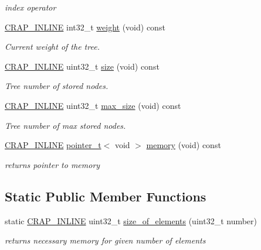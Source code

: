 \begin{DoxyCompactItemize}
\begin{DoxyCompactList}\small\item\em index operator \end{DoxyCompactList}\item 
\hyperlink{config__x86_8h_a5a40526b8d842e7ff731509998bb0f1c}{C\+R\+A\+P\+\_\+\+I\+N\+L\+I\+N\+E} int32\+\_\+t \hyperlink{classcrap_1_1tree_a19ad6ba585b2c718ac1384c4fb6a054f}{weight} (void) const 
\begin{DoxyCompactList}\small\item\em Current weight of the tree. \end{DoxyCompactList}\item 
\hyperlink{config__x86_8h_a5a40526b8d842e7ff731509998bb0f1c}{C\+R\+A\+P\+\_\+\+I\+N\+L\+I\+N\+E} uint32\+\_\+t \hyperlink{classcrap_1_1tree_aeb959132fdf029c341d17b4caf21ba43}{size} (void) const 
\begin{DoxyCompactList}\small\item\em Tree number of stored nodes. \end{DoxyCompactList}\item 
\hyperlink{config__x86_8h_a5a40526b8d842e7ff731509998bb0f1c}{C\+R\+A\+P\+\_\+\+I\+N\+L\+I\+N\+E} uint32\+\_\+t \hyperlink{classcrap_1_1tree_a325ba8dd1d5a510ce50116817583b605}{max\+\_\+size} (void) const 
\begin{DoxyCompactList}\small\item\em Tree number of max stored nodes. \end{DoxyCompactList}\item 
\hyperlink{config__x86_8h_a5a40526b8d842e7ff731509998bb0f1c}{C\+R\+A\+P\+\_\+\+I\+N\+L\+I\+N\+E} \hyperlink{structcrap_1_1pointer__t}{pointer\+\_\+t}$<$ void $>$ \hyperlink{classcrap_1_1tree_a64f079b15a1560ee59595e23a550d1d3}{memory} (void) const 
\begin{DoxyCompactList}\small\item\em returns pointer to memory \end{DoxyCompactList}\end{DoxyCompactItemize}
\subsection*{Static Public Member Functions}
\begin{DoxyCompactItemize}
\item 
static \hyperlink{config__x86_8h_a5a40526b8d842e7ff731509998bb0f1c}{C\+R\+A\+P\+\_\+\+I\+N\+L\+I\+N\+E} uint32\+\_\+t \hyperlink{classcrap_1_1tree_a5822b8d9f7be9a4ddd0cabe2f953449f}{size\+\_\+of\+\_\+elements} (uint32\+\_\+t number)
\begin{DoxyCompactList}\small\item\em returns necessary memory for given number of elements \end{DoxyCompactList}\end{DoxyCompactItemize}
